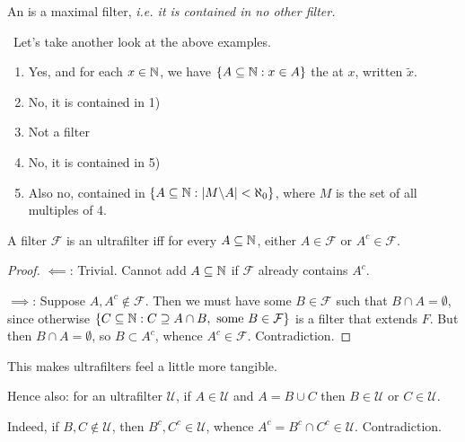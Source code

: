 \documentclass[10pt]{article}
\newcommand{\F}{\mathcal{F}}
\newcommand{\U}{\mathcal{U}}
\begin{document}
\begin{defin*}[Ultrafilter]
    An  is a maximal filter, \it{i.e.} it is contained in no other filter.
\end{defin*}
\begin{remark*}[Examples]\
    Let's take another look at the above examples. 
    \begin{enumerate}[label = \arabic*)]
        \item Yes, and for each $x \in \mathbb{N}$, we have $\{A\subseteq \mathbb{N} : x \in A\}$ the  at $x$, written $\tilde{x}$.
        \item No, it is contained in 1)
        \item Not a filter
        \item No, it is contained in 5)
        \item Also no, contained in $\{A\subseteq \mathbb{N} : |M\backslash A| < \aleph_0\}$, where $M$ is the set of all multiples of 4.
    \end{enumerate}
\end{remark*}

\begin{prop}
    A filter $\F$ is an ultrafilter iff for every $A \subseteq \mathbb{N}$, either $A \in \F$ or $A^c\in \F$.
\end{prop}
\begin{proof}
    \underline{$\impliedby$}: Trivial. Cannot add $A\subseteq \mathbb{N}$ if $\F$ already contains $A^c$.

    \underline{$\implies$}: Suppose $A,A^c \not\in \F$. Then we must have some $B \in \F$ such that $B\cap A = \emptyset$, since otherwise $\{C\subset \N : C\supseteq A\cap B,\textrm{ some }B\in \F\}$ is a filter that extends $F$. But then $B\cap A = \emptyset$, so $B\subset A^c$, whence $A^c \in \F$. Contradiction.
\end{proof}

This makes ultrafilters feel a little more tangible.

\begin{remark*}
    Hence also: for an ultrafilter $\U$, if $A \in \U$ and $A = B\cup C$ then $B \in \U$ or $C \in \U$.

    Indeed, if $B,C\not\in\U$, then $B^c,C^c\in \U$, whence $A^c = B^c \cap C^c \in \U$. Contradiction.
\end{remark*}
\end{document}
